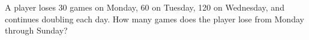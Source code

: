 A player loses 30 games on Monday, 60 on Tuesday, 120 on Wednesday, and continues doubling each day. How many games does the player lose from Monday through Sunday?
